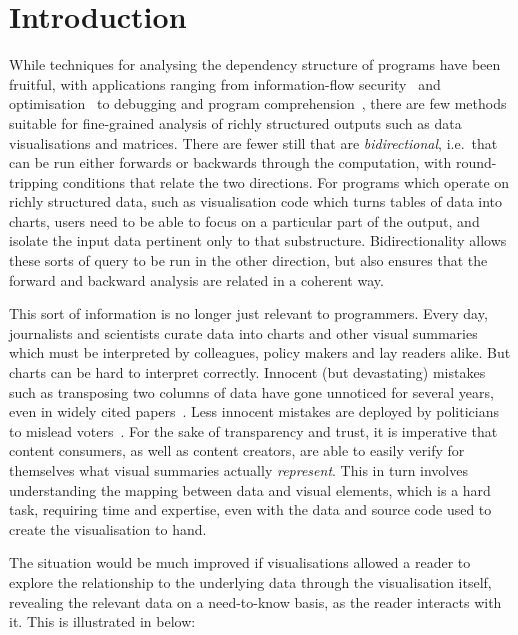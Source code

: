 \section{Introduction}

While techniques for analysing the dependency structure of programs have been fruitful, with applications ranging from information-flow security~\cite{sabelfeld03} and optimisation~\cite{kildall73} to debugging and program comprehension~\cite{weiser81,delucia96}, there are few methods suitable for fine-grained analysis of richly structured outputs such as data visualisations and matrices. There are fewer still that are \emph{bidirectional}, i.e.~that can be run either forwards or backwards through the computation, with round-tripping conditions that relate the two directions. For programs which operate on richly structured data, such as visualisation code which turns tables of data into charts, users need to be able to focus on a particular part of the output, and isolate the input data pertinent only to that substructure. Bidirectionality allows these sorts of query to be run in the other direction, but also ensures that the forward and backward analysis are related in a coherent way.

This sort of information is no longer just relevant to programmers. Every day, journalists and scientists curate data into charts and other visual summaries which must be interpreted by colleagues, policy makers and lay readers alike. But charts can be hard to interpret correctly. Innocent (but devastating) mistakes such as transposing two columns of data have gone unnoticed for several years, even in widely cited papers~\cite{miller06}. Less innocent mistakes are deployed by politicians to mislead voters~\cite{fullfact19}. For the sake of transparency and trust, it is imperative that content consumers, as well as content creators, are able to easily verify for themselves what visual summaries actually \emph{represent}. This in turn involves understanding the mapping between data and visual elements, which is a hard task, requiring time and expertise, even with the data and source code used to create the visualisation to hand.

The situation would be much improved if visualisations allowed a reader to explore the relationship to the underlying data through the visualisation itself, revealing the relevant data on a need-to-know basis, as the reader interacts with it. This is illustrated in  below:

